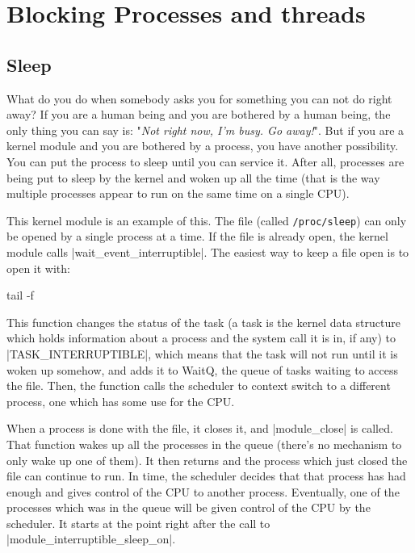 \documentclass[10pt, oneside]{book}
\begin{document}

\section{Blocking Processes and threads}
\label{sec:blocking_process_thread}
\subsection{Sleep}
\label{sec:sleep}
What do you do when somebody asks you for something you can not do right away?
If you are a human being and you are bothered by a human being, the only thing you can say is: "\emph{Not right now, I'm busy. Go away!}".
But if you are a kernel module and you are bothered by a process, you have another possibility.
You can put the process to sleep until you can service it.
After all, processes are being put to sleep by the kernel and woken up all the time (that is the way multiple processes appear to run on the same time on a single CPU).

This kernel module is an example of this.
The file (called \verb|/proc/sleep|) can only be opened by a single process at a time.
If the file is already open, the kernel module calls \cpp|wait_event_interruptible|.
The easiest way to keep a file open is to open it with:

\begin{codebash}
tail -f
\end{codebash}

This function changes the status of the task (a task is the kernel data structure which holds information about a process and the system call it is in,
if any) to \cpp|TASK_INTERRUPTIBLE|, which means that the task will not run until it is woken up somehow, and adds it to WaitQ, the queue of tasks waiting to access the file.
Then, the function calls the scheduler to context switch to a different process, one which has some use for the CPU.

When a process is done with the file, it closes it, and \cpp|module_close| is called.
That function wakes up all the processes in the queue (there's no mechanism to only wake up one of them).
It then returns and the process which just closed the file can continue to run.
In time, the scheduler decides that that process has had enough and gives control of the CPU to another process.
Eventually, one of the processes which was in the queue will be given control of the CPU by the scheduler.
It starts at the point right after the call to \cpp|module_interruptible_sleep_on|.
\end{document}
